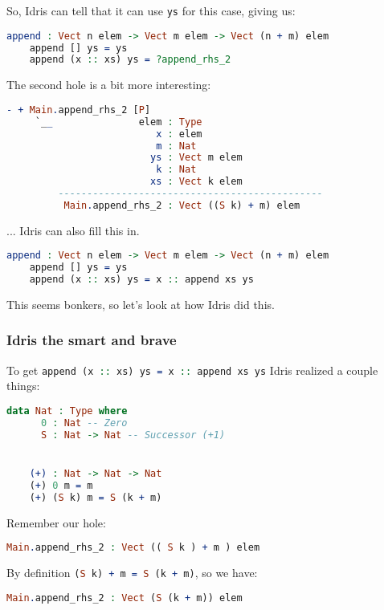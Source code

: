 \documentclass{beamer}
\begin{document}
\begin{frame}[fragile]
  So, Idris can tell that it can use \texttt{ys} for this case, giving us:

  \pause

  \begin{lstlisting}[language=Idris]
    append : Vect n elem -> Vect m elem -> Vect (n + m) elem
    append [] ys = ys
    append (x :: xs) ys = ?append_rhs_2
  \end{lstlisting}

  \pause

  The second hole is a bit more interesting:

  \begin{lstlisting}[language=Idris]
    - + Main.append_rhs_2 [P]
     `__               elem : Type
                          x : elem
                          m : Nat
                         ys : Vect m elem
                          k : Nat
                         xs : Vect k elem
         ----------------------------------------------
          Main.append_rhs_2 : Vect ((S k) + m) elem
  \end{lstlisting}

  \pause

  ... Idris can also fill this in.

  \pause

  \begin{lstlisting}[language=Idris]
    append : Vect n elem -> Vect m elem -> Vect (n + m) elem
    append [] ys = ys
    append (x :: xs) ys = x :: append xs ys
  \end{lstlisting}

  \pause

  This seems bonkers, so let's look at how Idris did this.
\end{frame}

\begin{frame}[fragile]
  \frametitle{Idris the smart and brave}

  To get \lstinline[language=Idris, columns=fixed]{append (x :: xs) ys = x :: append xs ys} Idris realized a couple things:

  \begin{lstlisting}[language=Idris]
    data Nat : Type where
      0 : Nat -- Zero
      S : Nat -> Nat -- Successor (+1)


    (+) : Nat -> Nat -> Nat
    (+) 0 m = m
    (+) (S k) m = S (k + m)
  \end{lstlisting}

  \pause
  Remember our hole:

  \begin{lstlisting}[language=Idris]
    Main.append_rhs_2 : Vect (( S k ) + m ) elem
  \end{lstlisting}

  \pause
  By definition \lstinline[language=Idris, columns=fixed]{(S k) + m = S (k + m)}, so we have:

  \pause
  \begin{lstlisting}[language=Idris]
    Main.append_rhs_2 : Vect (S (k + m)) elem
  \end{lstlisting}
\end{frame}
\end{document}
